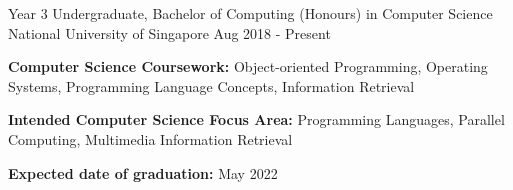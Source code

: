 

\begin{cventries}

  \cventry
    {Year 3 Undergraduate, Bachelor of Computing (Honours) in Computer Science} %
    {National University of Singapore} %
    {} %
    {Aug 2018 - Present} %
    {
      \begin{cvitems} %
        \item {\textbf{Computer Science Coursework:} Object-oriented Programming, Operating Systems, Programming Language Concepts, Information Retrieval}
        \item {\textbf{Intended Computer Science Focus Area:} Programming Languages, Parallel Computing, Multimedia Information Retrieval}
        \item {\textbf{Expected date of graduation:} May 2022}
      \end{cvitems}
    }

\end{cventries}
